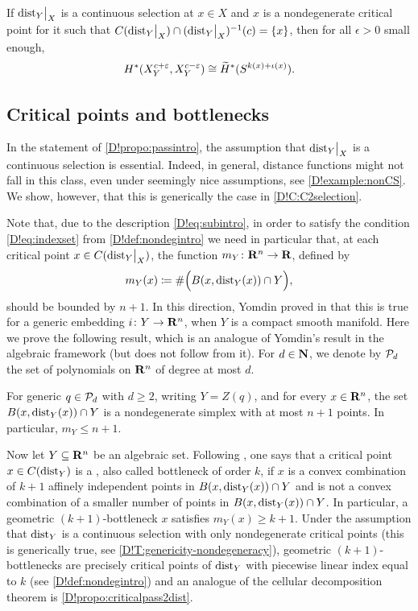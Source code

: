 \begin{proposition}
\label{D!propo:passintro}
  If $\mathord{\operatorname{dist}}_Y\big|_X$ is a continuous selection at $x \in X$ and $x$ is a nondegenerate critical point for it such that $C(\mathord{\operatorname{dist}}_Y\big|_X)\cap (\mathord{\operatorname{dist}}_Y\big|_X)^{-1}(c) = \{x\}$, then for all $\epsilon > 0$ small enough,
  \[
    H^*(X^{c + \varepsilon}_Y, X^{c - \varepsilon}_Y) \cong \widetilde{H}^*(S^{k(x)+\iota(x)}).
  \]
\end{proposition}

\subsection{Critical points and bottlenecks}

In the statement of \cref{D!propo:passintro}, the assumption that $\mathord{\operatorname{dist}}_Y\big|_X$ is a continuous selection is essential. Indeed, in general, distance functions might not fall in this class, even under seemingly nice assumptions, see \cref{D!example:nonCS}. We show, however, that this is generically the case in \cref{D!C:C2selection}.

Note that, due to the description \eqref{D!eq:subintro}, in order to satisfy the condition \ref{D!eq:indexset} from \cref{D!def:nondegintro} we need in particular that, at each critical point $x \in C(\mathord{\operatorname{dist}}_Y\big|_X)$, the function $m_Y \colon \mathbf{R}^n\to \mathbf{R}$, defined by
\[
  m_Y(x) \coloneq \# \Big( B(x, \operatorname{dist}_Y(x))\cap Y \Big),
\]
should be bounded by $n+1$.
In this direction, Yomdin proved in \cite[Proposition 3]{Yomdin1981} that this is true for a generic embedding $i \colon Y \to \mathbf{R}^n$, when $Y$ is a compact smooth manifold. Here we prove the following result, which is an analogue of Yomdin's result in the algebraic framework (but does not follow from it).
For $d\in \mathbf{N}$, we denote by $\mathcal{P}_d$ the set of polynomials on $\mathbf{R}^n$ of degree at most $d$.

\begin{theorem}
\label{D!T:Yomdinintro}
  For generic $q \in \mathcal{P}_d$ with $d \geq 2$, writing $Y = Z(q)$,  and for every $x\in\mathbf{R}^n$, the set $B(x, \operatorname{dist}_Y(x)) \cap Y$ is a nondegenerate simplex with at most $n + 1$ points. In particular, $m_Y \leq n + 1.$
\end{theorem}

Now let $Y \subseteq \mathbf{R}^n$ be an algebraic set. Following \cite{DEEGH2023}, one says that a critical point $x \in C(\operatorname{dist}_Y)$ is a , also called bottleneck of order $k$, if 
$x$ is a convex combination of $k+1$ affinely independent points in $B(x, \operatorname{dist}_Y(x))\cap Y$ and is not a convex combination of a smaller number of points in $B(x, \operatorname{dist}_Y(x))\cap Y$. In particular, a geometric $(k+1)$-bottleneck $x$ satisfies $m_Y(x) \ge k+1$.
Under the assumption that $\operatorname{dist}_Y$ is a continuous selection with only nondegenerate critical points (this is generically true, see \cref{D!T:genericity-nondegeneracy}), geometric $(k+1)$-bottlenecks are precisely critical points of $\operatorname{dist}_Y$ with piecewise linear index equal to $k$ (see \cref{D!def:nondegintro}) and an analogue of the cellular decomposition theorem is \cref{D!propo:criticalpass2dist}. 

